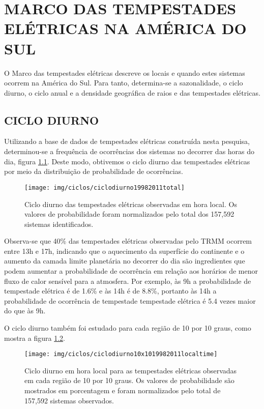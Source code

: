 \chapter{MARCO DAS TEMPESTADES ELÉTRICAS NA AMÉRICA DO SUL}

O Marco das tempestades elétricas descreve os locais e quando estes sistemas ocorrem na América do Sul. Para tanto, determina-se a sazonalidade, o ciclo diurno, o ciclo anual e a densidade geográfica de raios e das tempestades elétricas. 

\section{CICLO DIURNO}

Utilizando a base de dados de tempestades elétricas construída nesta pesquisa, determinou-se a frequência de ocorrências dos sistemas no decorrer das horas do dia, figura \ref{ciclodiurnototal}. Deste modo, obtivemos o ciclo diurno das tempestades elétricas por meio da distribuição de probabilidade de ocorrências.

\begin{figure}[!hb]
  \centering
  {{\texttt{[image: img/ciclos/ciclodiurno19982011total]}}}
\caption{Ciclo diurno das tempestades elétricas observadas em hora local. Os valores de probabilidade foram normalizados pelo total dos 157,592 sistemas identificados.}
\label{ciclodiurnototal}
\end{figure} 

Observa-se que 40\%  das tempestades elétricas observadas pelo TRMM ocorrem entre 13h e 17h, indicando que o aquecimento da superfície do continente e o aumento da camada limite planetária no decorrer do dia são ingredientes que podem aumentar a probabilidade de ocorrência em  relação aos horários de menor fluxo de calor sensível para a atmosfera. Por exemplo, às 9h a probabilidade de tempestade elétrica é de 1.6\% e às 14h é de 8.8\%, portanto às 14h a probabilidade de ocorrência de tempestade tempestade elétrica é 5.4 vezes maior do que às 9h.


O ciclo diurno também foi estudado para cada região de 10 por 10 graus, como mostra a figura \ref{diurno}. 

\begin{figure}[!hb]
\centering
{\texttt{[image: img/ciclos/ciclodiurno10x1019982011localtime]}}  
\caption{Ciclo diurno em hora local para as tempestades elétricas observadas em cada região de 10 por 10 graus. Os valores de probabilidade são mostrados em porcentagem e foram normalizados pelo total de 157,592 sistemas observados.}
\label{diurno}
\end{figure}

